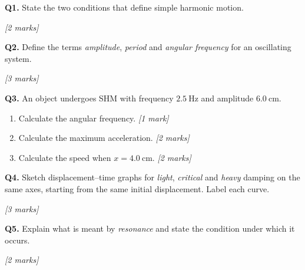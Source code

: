 \begin{tcolorbox}[colback=white, colframe=midblue, breakable]

\begin{minipage}{\linewidth}
\textbf{Q1.} State the two conditions that define simple harmonic motion.
\par\hfill\textit{[2 marks]}
\vspace{2.5cm}
\end{minipage}

\begin{minipage}{\linewidth}
\textbf{Q2.} Define the terms \emph{amplitude}, \emph{period} and \emph{angular frequency} for an oscillating system.
\par\hfill\textit{[3 marks]}
\vspace{3cm}
\end{minipage}

\begin{minipage}{\linewidth}
\textbf{Q3.} An object undergoes SHM with frequency $2.5\ \text{Hz}$ and amplitude $6.0\ \text{cm}$.
\begin{enumerate}[label=(\alph*)]
  \item Calculate the angular frequency.  \hfill\textit{[1 mark]}
  \vspace{2cm}
  \item Calculate the maximum acceleration.  \hfill\textit{[2 marks]}
  \vspace{2.5cm}
  \item Calculate the speed when $x = 4.0\ \text{cm}$.  \hfill\textit{[2 marks]}
  \vspace{2.5cm}
\end{enumerate}
\end{minipage}

\begin{minipage}{\linewidth}
\textbf{Q4.} Sketch displacement–time graphs for \emph{light}, \emph{critical} and \emph{heavy} damping on the same axes, starting from the same initial displacement. Label each curve.
\par\hfill\textit{[3 marks]}
\vspace{6cm}
\end{minipage}

\begin{minipage}{\linewidth}
\textbf{Q5.} Explain what is meant by \emph{resonance} and state the condition under which it occurs.
\par\hfill\textit{[2 marks]}
\vspace{2.5cm}
\end{minipage}

\end{tcolorbox}

